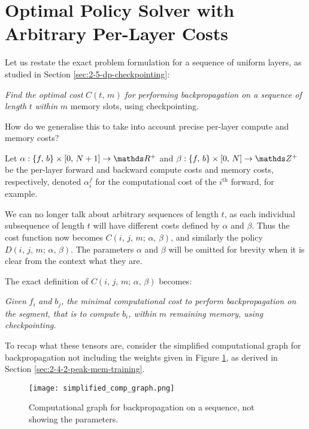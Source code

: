 \section{Optimal Policy Solver with Arbitrary Per-Layer Costs}

Let us restate the exact problem formulation for a sequence of uniform layers, as studied in Section \ref{sec:2-5-dp-checkpointing}:

\textit{Find the optimal cost }\(C(t,\,m)\)\textit{ for performing backpropagation on a sequence of length }\(t\)\textit{ within }\(m\){ memory slots, using checkpointing.}

How do we generalise this to take into account precise per-layer compute and memory costs?

Let \(\alpha : \{f,\, b\}\times[0,\, N+1] \rightarrow \R^+\) and \(\beta : \{f,\, b\}\times[0,\, N] \rightarrow \Z^+\) be the per-layer forward and backward compute costs and memory costs, respectively, denoted \(\alpha^f_i\) for the computational cost of the \(i^\mathrm{th}\) forward, for example.

We can no longer talk about arbitrary sequences of length \(t\), as each individual subsequence of length \(t\) will have different costs defined by \(\alpha\) and \(\beta\).
Thus the cost function now becomes \(C(i,\, j,\, m;\, \alpha,\, \beta)\), and similarly the policy \(D(i,\, j,\, m;\, \alpha,\, \beta)\).
The parameters \(\alpha\) and \(\beta\) will be omitted for brevity when it is clear from the context what they are.

The exact definition of \(C(i,\, j,\, m;\, \alpha,\, \beta)\) becomes:

\textit{Given }\(f_i\)\textit{ and }\(b_j\)\textit{, the minimal computational cost to perform backpropagation on the segment, that is to compute }\(b_i\)\textit{, within }\(m\)\textit{ remaining memory, using checkpointing.}

To recap what these tensors are, consider the simplified computational graph for backpropagation not including the weights given in Figure \ref{fig:3-comp-graph}, as derived in Section \ref{sec:2-4-2-peak-mem-training}.

\begin{figure}[h]
    \centering
    \texttt{[image: simplified\_comp\_graph.png]}
    \caption{Computational graph for backpropagation on a sequence, not showing the parameters.}
    \label{fig:3-comp-graph}
\end{figure}

